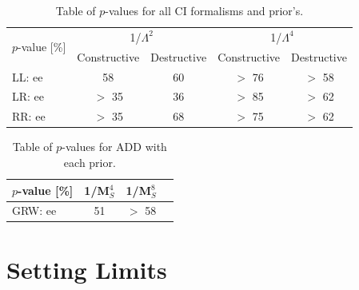     \begin {table}[h]
        \begin{center}
        \begin{tabular}{ | l | c | c | c | c | } 
            \hline
            \multirow{2}{*}{$p$-value [\%]} & \multicolumn{2}{c|}{1/$\Lambda^2$} & \multicolumn{2}{c|}{1/$\Lambda^4$} \\
            \cline{2-5}
            & Constructive & Destructive & Constructive & Destructive \\
            \hline
            LL: ee & 58 & 60 & $>$ 76 & $>$ 58 \\
            LR: ee & $>$ 35 & 36 & $>$ 85 & $>$ 62 \\
            RR: ee & $>$ 35 & 68 & $>$ 75 & $>$ 62 \\
            \hline
        \end{tabular}
        \caption{Table of $p$-values for all CI formalisms and prior's.}
        \label{tab:pvalue_CI}
        \end{center}
    \end {table}


    \begin {table}[h]
        \begin{center}
        \begin{tabular}{ | l | c | c | c | } 
            \hline
            $p$-value [\%] & 1/M$_S^4$ & 1/M$_S^8$ \\
            \hline
            GRW: ee & 51 & $>$ 58 \\
            \hline
        \end{tabular}
        \caption{Table of $p$-values for ADD with each prior.}
        \label{tab:pvalue_ADD}
        \end{center}
    \end {table}






\section{Setting Limits}
    

